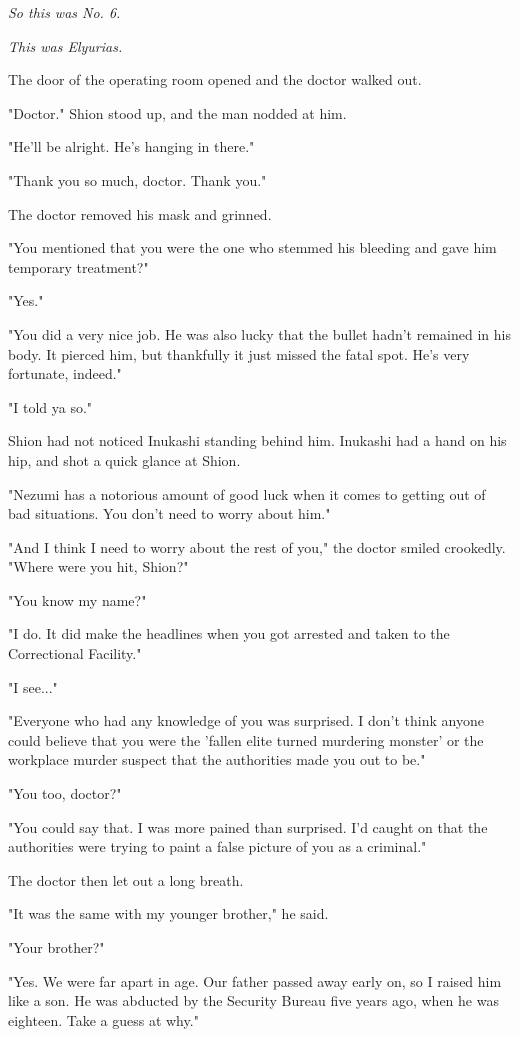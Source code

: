 \emph{So this was No. 6.}

\emph{This was Elyurias.}

The door of the operating room opened and the doctor walked out.

"Doctor." Shion stood up, and the man nodded at him.

"He'll be alright. He's hanging in there."

"Thank you so much, doctor. Thank you."

The doctor removed his mask and grinned.

"You mentioned that you were the one who stemmed his bleeding and gave
him temporary treatment?"

"Yes."

"You did a very nice job. He was also lucky that the bullet hadn't
remained in his body. It pierced him, but thankfully it just missed the
fatal spot. He's very fortunate, indeed."

"I told ya so."

Shion had not noticed Inukashi standing behind him. Inukashi had a hand
on his hip, and shot a quick glance at Shion.

"Nezumi has a notorious amount of good luck when it comes to getting out
of bad situations. You don't need to worry about him."

"And I think I need to worry about the rest of you," the doctor smiled
crookedly. "Where were you hit, Shion?"

"You know my name?"

"I do. It did make the headlines when you got arrested and taken to the
Correctional Facility."

"I see..."

"Everyone who had any knowledge of you was surprised. I don't think
anyone could believe that you were the 'fallen elite turned murdering
monster' or the workplace murder suspect that the authorities made you
out to be."

"You too, doctor?"

"You could say that. I was more pained than surprised. I'd caught on
that the authorities were trying to paint a false picture of you as a
criminal."

The doctor then let out a long breath.

"It was the same with my younger brother," he said.

\mybreak

"Your brother?"

"Yes. We were far apart in age. Our father passed away early on, so I
raised him like a son. He was abducted by the Security Bureau five years
ago, when he was eighteen. Take a guess at why."

